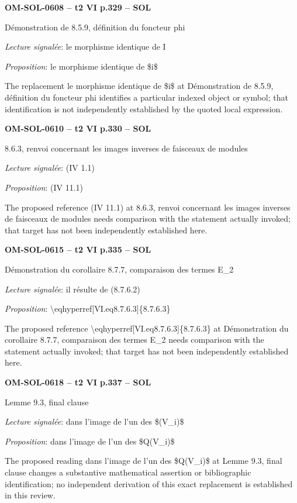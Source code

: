 \par\noindent\textbf{OM-SOL-0608 -- t2 VI p.329 -- SOL}\par
Démonstration de 8.5.9, définition du foncteur phi\par
\emph{Lecture signalée}: le morphisme identique de I\par
\emph{Proposition}: le morphisme identique de \$i\$\par
The replacement le morphisme identique de \$i\$ at Démonstration de 8.5.9, définition du foncteur phi identifies a particular indexed object or symbol; that identification is not independently established by the quoted local expression.\par
\par\noindent\textbf{OM-SOL-0610 -- t2 VI p.330 -- SOL}\par
8.6.3, renvoi concernant les images inverses de faisceaux de modules\par
\emph{Lecture signalée}: (IV 1.1)\par
\emph{Proposition}: (IV 11.1)\par
The proposed reference (IV 11.1) at 8.6.3, renvoi concernant les images inverses de faisceaux de modules needs comparison with the statement actually invoked; that target has not been independently established here.\par
\par\noindent\textbf{OM-SOL-0615 -- t2 VI p.335 -- SOL}\par
Démonstration du corollaire 8.7.7, comparaison des termes E\_2\par
\emph{Lecture signalée}: il résulte de (8.7.6.2)\par
\emph{Proposition}: \textbackslash{}eqhyperref[VI.eq8.7.6.3]\{8.7.6.3\}\par
The proposed reference \textbackslash{}eqhyperref[VI.eq8.7.6.3]\{8.7.6.3\} at Démonstration du corollaire 8.7.7, comparaison des termes E\_2 needs comparison with the statement actually invoked; that target has not been independently established here.\par
\par\noindent\textbf{OM-SOL-0618 -- t2 VI p.337 -- SOL}\par
Lemme 9.3, final clause\par
\emph{Lecture signalée}: dans l'image de l'un des \$(V\_i)\$\par
\emph{Proposition}: dans l'image de l'un des \$Q(V\_i)\$\par
The proposed reading dans l'image de l'un des \$Q(V\_i)\$ at Lemme 9.3, final clause changes a substantive mathematical assertion or bibliographic identification; no independent derivation of this exact replacement is established in this review.\par
